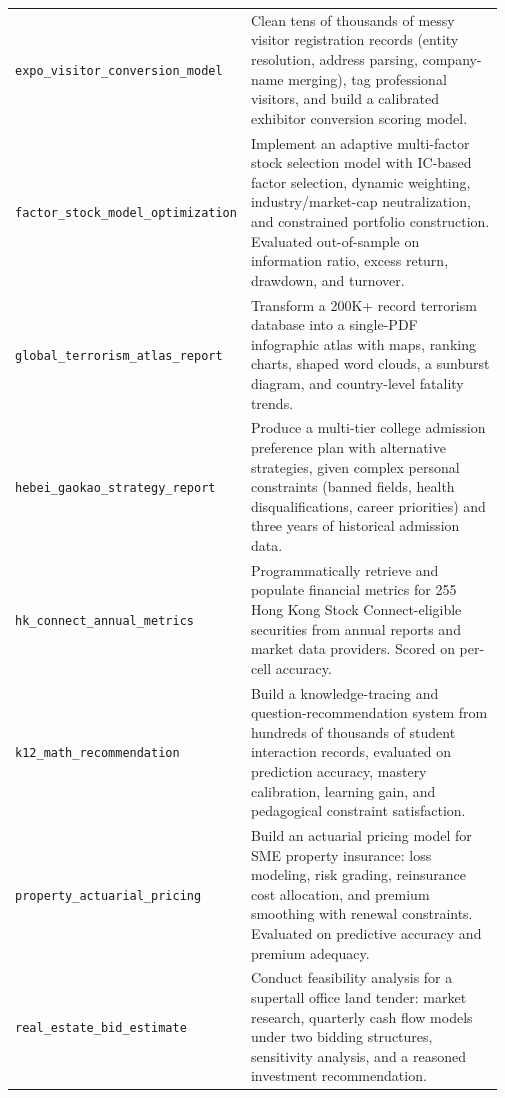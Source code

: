 \begin{longtable}{@{}>{\raggedright\arraybackslash}p{0.20\linewidth}>{\raggedright\arraybackslash}p{0.77\linewidth}@{}}
\texttt{expo\_\allowbreak{}visitor\_\allowbreak{}conversion\_\allowbreak{}model} & Clean tens of thousands of messy visitor registration records (entity resolution, address parsing, company-name merging), tag professional visitors, and build a calibrated exhibitor conversion scoring model. \\
\tasknoterule
\texttt{factor\_\allowbreak{}stock\_\allowbreak{}model\_\allowbreak{}optimization} & Implement an adaptive multi-factor stock selection model with IC-based factor selection, dynamic weighting, industry/market-cap neutralization, and constrained portfolio construction. Evaluated out-of-sample on information ratio, excess return, drawdown, and turnover. \\
\tasknoterule
\texttt{global\_\allowbreak{}terrorism\_\allowbreak{}atlas\_\allowbreak{}report} & Transform a 200K+ record terrorism database into a single-PDF infographic atlas with maps, ranking charts, shaped word clouds, a sunburst diagram, and country-level fatality trends. \\
\tasknoterule
\texttt{hebei\_\allowbreak{}gaokao\_\allowbreak{}strategy\_\allowbreak{}report} & Produce a multi-tier college admission preference plan with alternative strategies, given complex personal constraints (banned fields, health disqualifications, career priorities) and three years of historical admission data. \\
\tasknoterule
\texttt{hk\_\allowbreak{}connect\_\allowbreak{}annual\_\allowbreak{}metrics} & Programmatically retrieve and populate financial metrics for 255 Hong Kong Stock Connect-eligible securities from annual reports and market data providers. Scored on per-cell accuracy. \\
\tasknoterule
\texttt{k12\_\allowbreak{}math\_\allowbreak{}recommendation} & Build a knowledge-tracing and question-recommendation system from hundreds of thousands of student interaction records, evaluated on prediction accuracy, mastery calibration, learning gain, and pedagogical constraint satisfaction. \\
\tasknoterule
\texttt{property\_\allowbreak{}actuarial\_\allowbreak{}pricing} & Build an actuarial pricing model for SME property insurance: loss modeling, risk grading, reinsurance cost allocation, and premium smoothing with renewal constraints. Evaluated on predictive accuracy and premium adequacy. \\
\tasknoterule
\texttt{real\_\allowbreak{}estate\_\allowbreak{}bid\_\allowbreak{}estimate} & Conduct feasibility analysis for a supertall office land tender: market research, quarterly cash flow models under two bidding structures, sensitivity analysis, and a reasoned investment recommendation. \\

\end{longtable}

